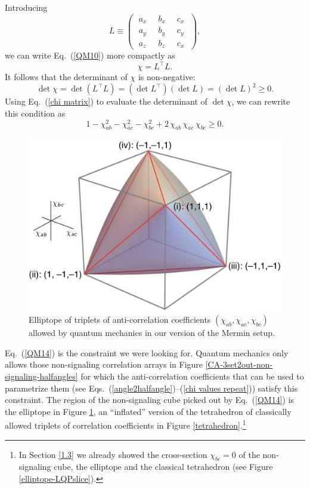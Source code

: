 Introducing
\begin{equation}
L \equiv
\begin{pmatrix}
\; a_x \; & \; b_x \; & \;  c_x \; \\[.2cm]
\; a_y \; & \; b_y \; & \;  c_y \; \\[.2cm]
 \; a_z \; & \; b_z \; & \;  c_x 
\end{pmatrix},
\label{QM11}
\end{equation}
we can write Eq.\ (\ref{QM10}) more compactly as
\begin{equation}
\chi = L^\top L.
\label{QM12}
\end{equation}
It follows that the determinant of $\chi$ is non-negative: 
\begin{equation}
\det{\chi} = \det{\!(L^\top L)} = (\det{L^\top})(\det{L}) = (\det{L})^2 \ge 0. 
\label{QM13}
\end{equation}
Using Eq.\ (\ref{chi matrix}) to evaluate the determinant of $\det{\chi}$, we can rewrite this condition as
\begin{equation}
1 - \chi_{ab}^2 - \chi_{ac}^2 - \chi_{bc}^2 + 2 \, \chi_{ab} \, \chi_{ac} \, \chi_{bc} \ge 0.
\label{QM14}
\end{equation}

\begin{figure}[ht]
 \centering
   \includegraphics[width=4.5in]{elliptope.jpeg} 
   \caption{Elliptope of triplets of anti-correlation coefficients $(\chi_{ab}, \chi_{ac}, \chi_{bc})$ allowed by quantum mechanics in our version of the Mermin setup.}
   \label{elliptope}
\end{figure}

Eq.\ (\ref{QM14}) is the constraint we were looking for. Quantum mechanics only allows those non-signaling correlation arrays in Figure \ref{CA-3set2out-non-signaling-halfangles}  for which the anti-correlation coefficients that can be used to parametrize them (see Eqs.\ (\ref{angle2halfangle})--(\ref{chi values repeat})) satisfy this constraint. The region of the non-signaling cube picked out by Eq.\ (\ref{QM14})  is the elliptope in Figure \ref{elliptope}, an ``inflated'' version of the tetrahedron of classically allowed triplets of correlation coefficients in Figure \ref{tetrahedron}.\footnote{In Section \ref{1.3} we already showed the cross-section $\chi_{bc} = 0$ of the non-signaling cube, the elliptope and the classical tetrahedron (see Figure \ref{elliptope-LQPslice}).} 

